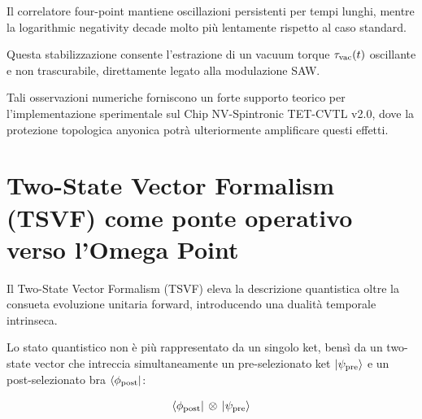 \documentclass[11pt,a4paper]{article}
\let\oldcite\cite
\renewcommand{\cite}{\protect\oldcite}
\theoremstyle{plain}
\theoremstyle{definition}
\begin{document}
Il correlatore four-point mantiene oscillazioni persistenti per tempi lunghi, mentre la logarithmic negativity decade molto più lentamente rispetto al caso standard. 



\vspace{0.4cm}


Questa stabilizzazione consente l'estrazione di un vacuum torque $\tau_{\rm vac}(t)$ oscillante e non trascurabile, direttamente legato alla modulazione SAW. 


\vspace{0.4cm}

Tali osservazioni numeriche forniscono un forte supporto teorico per l'implementazione sperimentale sul Chip NV-Spintronic TET-CVTL v2.0, dove la protezione topologica anyonica potrà ulteriormente amplificare questi effetti.





\vspace{0.6cm}


\section{Two-State Vector Formalism (TSVF) come ponte operativo verso l'Omega Point}


\vspace{0.5cm}


Il Two-State Vector Formalism (TSVF) \cite{aharonov_two_state_1988} eleva la descrizione quantistica oltre la consueta evoluzione unitaria forward, introducendo una dualità temporale intrinseca. 



\vspace{0.5cm}


Lo stato quantistico non è più rappresentato da un singolo ket, bensì da un two-state vector che intreccia simultaneamente un pre-selezionato ket $|\psi_{\rm pre}\rangle$ e un post-selezionato bra $\langle \phi_{\rm post}|$:

\vspace{0.4cm}

\begin{tcolorbox}[
  colback=cyan!5!white, 
  colframe=cyan!70!black, 
  title=Two-State Vector nel TSVF, 
  fonttitle=\bfseries,
  breakable,
  enhanced,
  width=\textwidth,
  boxrule=0.9pt,
  arc=6pt
]
\begin{equation}
\langle \phi_{\rm post} | \,\otimes\, | \psi_{\rm pre} \rangle
\label{eq:tsvf_state}
\end{equation}
\end{tcolorbox}
\end{document}
